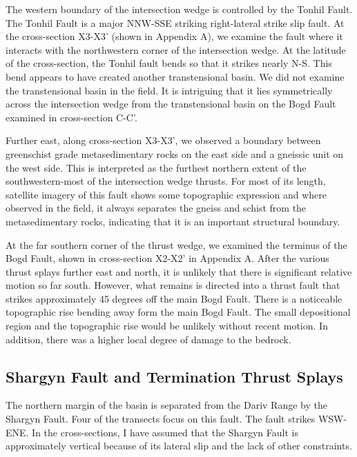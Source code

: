 The western boundary of the intersection wedge is controlled by the Tonhil Fault. The Tonhil Fault is a major NNW-SSE striking right-lateral strike slip fault. At the cross-section X3-X3' (shown in Appendix A), we examine the fault where it interacts with the northwestern corner of the intersection wedge. At the latitude of the cross-section, the Tonhil fault bends so that it strikes nearly N-S. This bend appears to have created another transtensional basin. We did not examine the transtensional basin in the field. It is intriguing that it lies symmetrically across the intersection wedge from the transtensional basin on the Bogd Fault examined in cross-section C-C'. 

Further east, along cross-section X3-X3', we observed a boundary between greenschist grade metasedimentary rocks on the east side and a gneissic unit on the west side. This is interpreted as the furthest northern extent of the southwestern-most of the intersection wedge thrusts. For most of its length, satellite imagery of this fault shows some topographic expression and where observed in the field, it always separates the gneiss and schist from the metasedimentary rocks, indicating that it is an important structural boundary. 

At the far southern corner of the thrust wedge, we examined the terminus of the Bogd Fault, shown in cross-section X2-X2' in Appendix A. After the various thrust splays further east and north, it is unlikely that there is significant relative motion so far south. However, what remains is directed into a thrust fault that strikes approximately 45 degrees off the main Bogd Fault. There is a noticeable topographic rise bending away form the main Bogd Fault. The small depositional region and the topographic rise would be unlikely without recent motion. In addition, there was a higher local degree of damage to the bedrock. 

\subsection{Shargyn Fault and Termination Thrust Splays}

The northern margin of the basin is separated from the Dariv Range by the Shargyn Fault. Four of the transects focus on this fault. The fault strikes WSW-ENE. In the cross-sections, I have assumed that the Shargyn Fault is approximately vertical because of its lateral slip and the lack of other constraints. 

